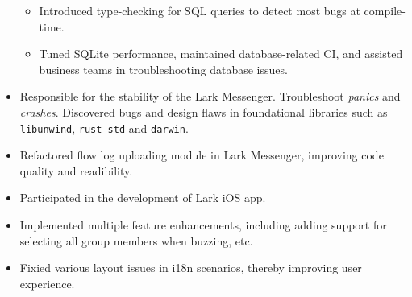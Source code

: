 \documentclass{resume}
\newcommand{\en}[1]{#1}
\newcommand{\zh}[1]{}
\begin{document}
\begin{itemize}
\begin{itemize}
{                        }
                        \zh{
                              开发了一个异步的 sqlite 连接池，相较于 \texttt{r2d2} 吞吐量更高。
                        }
                  \item \en{
                              Introduced type-checking for SQL queries to detect most bugs at compile-time.
                        }
                        \zh{
                              引入了 SQL 查询语句的类型检查机制，在编译时能发现大部分 bug。
                        }
                  \item \en{
                              Tuned SQLite performance, maintained database-related CI, 
                              and assisted business teams in troubleshooting database issues.
                        }
                        \zh{
                              进行 sqlite 调优，维护数据库相关 CI，协助业务方排查数据库相关的问题。
                        }
            \end{itemize}
      \item \en{
                Responsible for the stability of the Lark Messenger. Troubleshoot \textit{panics} and \textit{crashes}.
                Discovered bugs and design flaws in foundational libraries such as \texttt{libunwind}, \texttt{rust std} and \texttt{darwin}.
            }
            \zh{
                负责飞书客户端的稳定性，包括定位并修复 \textit{panic} 和 \textit{crash}。
                在定位过程中发现了 \texttt{libunwind}、\texttt{rust std} 和 \texttt{darwin} 等基础库的一些 bug 和设计缺陷。
            }
      \item \en{
                Refactored flow log uploading module in Lark Messenger, improving code quality and readibility.
            }
            \zh{
                重构了飞书的日志上传模块，提升了代码质量和可读性。
            }
\end{itemize}

\en{}
\zh{\datedsubsection{\textbf{\href{https://www.bytedance.com/}{字节跳动}}}{04/2020 -- 07/2020}}
\en{}
\zh{\role{飞书}{iOS 研发实习}}
\begin{itemize}
      \item \en{Participated in the development of Lark iOS app.}
            \zh{参与飞书 iOS 端业务研发，负责开发新功能和维护现有功能。}
      \item \en{
                  Implemented multiple feature enhancements, 
                  including adding support for selecting all group members when buzzing, etc.
            }
            \zh{实现了多项功能改进，包括提升文件传输大小限制、群加急选人支持全选等功能。}
      \item \en{Fixied various layout issues in i18n scenarios, thereby improving user experience.}
            \zh{参与品质优化相关项目，修复了多个国际化场景下 iOS 端的布局问题，提升了用户体验。}
\end{itemize}
\end{document}
